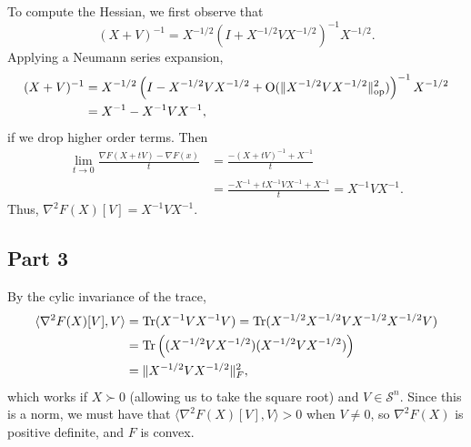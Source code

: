 \documentclass{article}
\begin{document}
To compute the Hessian, we first observe that 
\[
(X+V)^{-1}=X^{-1/2}\left(I+X^{-1/2}VX^{-1/2}\right)^{-1}X^{-1/2}.
\]
Applying a Neumann series expansion,
\begin{align*}
(X+V)^{-1}&=X^{-1/2}\left(I-X^{-1/2}VX^{-1/2}+\operatorname{O}(\|X^{-1/2}VX^{-1/2}\|^2_{\text{op}})\right)^{-1}X^{-1/2}\\&=X^{-1}-X^{-1}VX^{-1},
\end{align*}
if we drop higher order terms. Then
\begin{align*}
\lim_{t\to0}\frac{\nabla F(X+tV)-\nabla F(x)}{t}&=\frac{-(X+tV)^{-1}+X^{-1}}{t}\\&=\frac{-X^{-1}+tX^{-1}VX^{-1}+X^{-1}}{t}=X^{-1}VX^{-1}.
\end{align*}
Thus, $\nabla^2 F(X)[V]=X^{-1}VX^{-1}$.

\subsection{Part 3}
By the cylic invariance of the trace,
\begin{align*}
\langle\nabla^2 F(X)[V],V\rangle&=\operatorname{Tr}(X^{-1}VX^{-1}V)=\operatorname{Tr}(X^{-1/2}X^{-1/2}VX^{-1/2}X^{-1/2}V)\\&=
\operatorname{Tr}\left((X^{-1/2}VX^{-1/2})(X^{-1/2}VX^{-1/2})\right)\\&=
\|X^{-1/2}VX^{-1/2}\|_F^2,
\end{align*}
which works if $X\succ0$ (allowing us to take the square root) and $V\in\mathcal S^n$. Since this is a norm, we must have that $\langle\nabla^2 F(X)[V],V\rangle>0$ when $V\neq0$, so $\nabla^2 F(X)$ is positive definite, and $F$ is convex.
\end{document}
